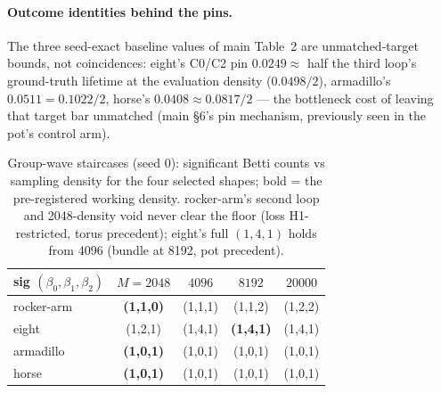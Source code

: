 \paragraph{Outcome identities behind the pins.}
The three seed-exact baseline values of main Table~2 are unmatched-target
bounds, not coincidences: eight's C0/C2 pin $0.0249 \approx$ half the
third loop's ground-truth lifetime at the evaluation density
($0.0498/2$), armadillo's $0.0511 = 0.1022/2$, horse's
$0.0408 \approx 0.0817/2$ --- the bottleneck cost of leaving that
target bar unmatched (main \S6's pin mechanism, previously seen in the
pot's control arm).

\begin{table}[t]
\centering
\caption{Group-wave staircases (seed 0): significant Betti counts vs
sampling density for the four selected shapes; bold = the pre-registered
working density. rocker-arm's second loop and 2048-density void never
clear the floor (loss H1-restricted, torus precedent); eight's full
$(1,4,1)$ holds from 4096 (bundle at 8192, pot precedent).}
\label{tab:gwstair}
\scriptsize
\setlength{\tabcolsep}{4pt}
\begin{tabular}{lcccc}
\toprule
sig $(\beta_0,\beta_1,\beta_2)$ & $M{=}2048$ & $4096$ & $8192$ & $20000$ \\
\midrule
rocker-arm & \textbf{(1,1,0)} & (1,1,1) & (1,1,2) & (1,2,2) \\
eight      & (1,2,1) & (1,4,1) & \textbf{(1,4,1)} & (1,4,1) \\
armadillo  & \textbf{(1,0,1)} & (1,0,1) & (1,0,1) & (1,0,1) \\
horse      & \textbf{(1,0,1)} & (1,0,1) & (1,0,1) & (1,0,1) \\
\bottomrule
\end{tabular}
\end{table}

